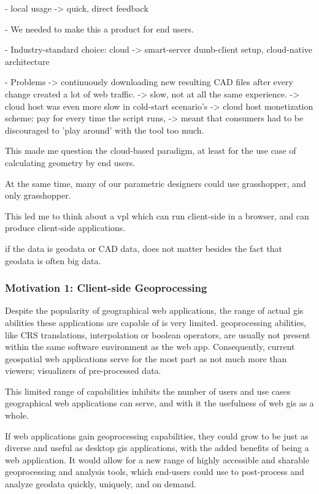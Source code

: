 - local usage 
  -> quick, direct feedback

- We needed to make this a product for end users. 

- Industry-standard choice: cloud 
  -> smart-server dumb-client setup, cloud-native architecture 

- Problems
  -> continuously downloading new resulting CAD files after every change created a lot of web traffic. 
  -> slow, not at all the same experience.
  -> cloud host was even more slow in cold-start scenario's   
  -> cloud host monetization scheme: pay for every time the script runs, 
     -> meant that consumers had to be discouraged to 'play around' with the tool too much. 
  
This made me question the cloud-based paradigm, at least for the use case of calculating geometry by end users. 

At the same time, many of our parametric designers could use grasshopper, and only grasshopper. 

This led me to think about a vpl which can run client-side in a browser, and can produce client-side applications.

if the data is geodata or CAD data, does not matter besides the fact that geodata is often big data.

\subsubsection{Motivation 1: Client-side Geoprocessing}

Despite the popularity of geographical web applications, the range of actual \ac{gis} abilities these applications are capable of is very limited. \ac{geoprocessing} abilities, like CRS translations, interpolation or boolean operators, are usually not present within the same software environment as the web app. Consequently, current geospatial web applications serve for the most part as not much more than viewers; visualizers of pre-processed data. 

This limited range of capabilities inhibits the number of users and use cases geographical web applications can serve, and with it the usefulness of web \ac{gis} as a whole. 

If web applications gain \ac{geoprocessing} capabilities, they could grow to be just as diverse and useful as desktop \ac{gis} applications, with the added benefits of being a web application. It would allow for a new range of highly accessible and sharable geoprocessing and analysis tools, which end-users could use to post-process and analyze geodata quickly, uniquely, and on demand.

